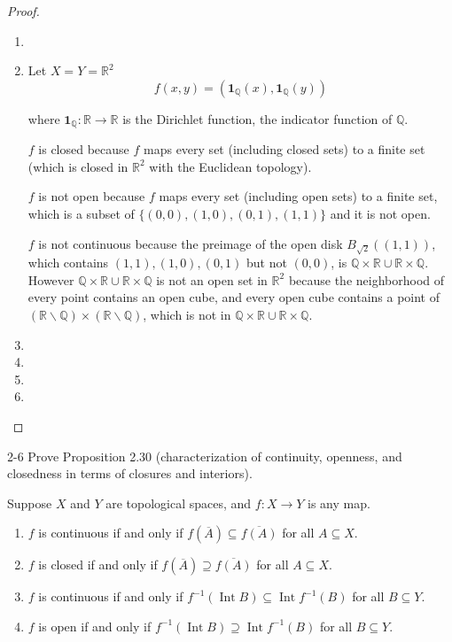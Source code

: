 \begin{proof}
	\begin{enumerate}[label={(\alph*)}]
		\item
		\item Let $X = Y = \mathbb{R}^{2}$
		      \[
			      f(x, y) = (\mathbf{1}_{\mathbb{Q}}(x), \mathbf{1}_{\mathbb{Q}}(y))
		      \]

		      where $\mathbf{1}_{\mathbb{Q}}: \mathbb{R} \to \mathbb{R}$ is the Dirichlet function, the indicator function of $\mathbb{Q}$.

		      $f$ is closed because $f$ maps every set (including closed sets) to a finite set (which is closed in $\mathbb{R}^{2}$ with the Euclidean topology).

		      $f$ is not open because $f$ maps every set (including open sets) to a finite set, which is a subset of $\{ (0, 0), (1, 0), (0, 1), (1, 1) \}$ and it is not open.

		      $f$ is not continuous because the preimage of the open disk $B_{\sqrt{2}}((1, 1))$, which contains $(1, 1), (1, 0), (0, 1)$ but not $(0, 0)$, is $\mathbb{Q}\times\mathbb{R} \cup \mathbb{R}\times\mathbb{Q}$. However $\mathbb{Q}\times\mathbb{R} \cup \mathbb{R}\times\mathbb{Q}$ is not an open set in $\mathbb{R}^{2}$ because the neighborhood of every point contains an open cube, and every open cube contains a point of $(\mathbb{R}\smallsetminus\mathbb{Q})\times (\mathbb{R}\smallsetminus\mathbb{Q})$, which is not in $\mathbb{Q}\times\mathbb{R} \cup \mathbb{R}\times\mathbb{Q}$.
		\item
		\item
		\item
		\item
	\end{enumerate}
\end{proof}

\begin{problem}{2-6}
Prove Proposition 2.30 (characterization of continuity, openness, and closedness in terms of closures and interiors).

Suppose $X$ and $Y$ are topological spaces, and $f: X\to Y$ is any map.
\begin{enumerate}[label={(\alph*)}]
	\item $f$ is continuous if and only if $f(\overline{A}) \subseteq \overline{f(A)}$ for all $A\subseteq X$.
	\item $f$ is closed if and only if $f(\overline{A})\supseteq \overline{f(A)}$ for all $A\subseteq X$.
	\item $f$ is continuous if and only if $f^{-1}(\operatorname{Int}B) \subseteq \operatorname{Int} f^{-1}(B)$ for all $B\subseteq Y$.
	\item $f$ is open if and only if $f^{-1}(\operatorname{Int} B) \supseteq \operatorname{Int} f^{-1}(B)$ for all $B\subseteq Y$.
\end{enumerate}
\end{problem}


